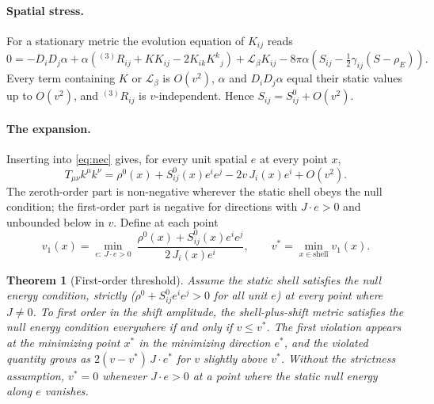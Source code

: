 \documentclass[11pt,a4paper]{article}
\newtheorem{theorem}{Theorem}
\theoremstyle{remark}
\begin{document}
\paragraph{Spatial stress.} For a stationary metric the evolution equation of $K_{ij}$ reads
\begin{equation}
0 = -D_iD_j\alpha + \alpha\left({}^{(3)}\!R_{ij} + KK_{ij} - 2K_{ik}K^k{}_j\right) + \mathcal{L}_\beta K_{ij} - 8\pi\alpha\left(S_{ij} - \tfrac12\gamma_{ij}(S-\rho_E)\right).
\end{equation}
Every term containing $K$ or $\mathcal{L}_\beta$ is $O(v^2)$, $\alpha$ and $D_iD_j\alpha$ equal their static values up to $O(v^2)$, and ${}^{(3)}\!R_{ij}$ is $v$-independent. Hence $S_{ij} = S^0_{ij} + O(v^2)$.

\paragraph{The expansion.} Inserting into \eqref{eq:nec} gives, for every unit spatial $e$ at every point $x$,
\begin{equation}
T_{\mu\nu}k^\mu k^\nu = \rho^0(x) + S^0_{ij}(x)e^ie^j - 2v\,J_i(x)e^i + O(v^2).
\label{eq:expansion}
\end{equation}
The zeroth-order part is non-negative wherever the static shell obeys the null condition; the first-order part is negative for directions with $J\cdot e > 0$ and unbounded below in $v$. Define at each point
\begin{equation}
v_1(x) = \min_{e:\ J\cdot e>0}\ \frac{\rho^0(x) + S^0_{ij}(x)e^ie^j}{2\,J_i(x)e^i}, \qquad v^* = \min_{x\in\text{shell}} v_1(x).
\label{eq:vstar}
\end{equation}

\begin{theorem}[First-order threshold]\label{thm:first}
Assume the static shell satisfies the null energy condition, strictly ($\rho^0 + S^0_{ij}e^ie^j > 0$ for all unit $e$) at every point where $J \neq 0$. To first order in the shift amplitude, the shell-plus-shift metric satisfies the null energy condition everywhere if and only if $v \le v^*$. The first violation appears at the minimizing point $x^*$ in the minimizing direction $e^*$, and the violated quantity grows as $2(v - v^*)\,J\cdot e^*$ for $v$ slightly above $v^*$. Without the strictness assumption, $v^* = 0$ whenever $J\cdot e > 0$ at a point where the static null energy along $e$ vanishes.
\end{theorem}
\end{document}
